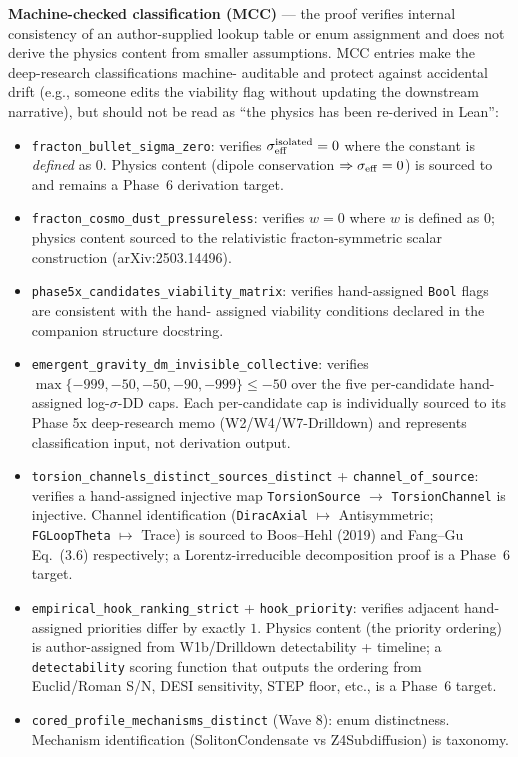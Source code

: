 \documentclass[aps,prd,twocolumn,showpacs,superscriptaddress,nofootinbib]{revtex4-2}
\begin{document}
\textbf{Machine-checked classification (MCC)} --- the proof verifies
internal consistency of an author-supplied lookup table or enum
assignment and does not derive the physics content from smaller
assumptions. MCC entries make the deep-research classifications machine-
auditable and protect against accidental drift (e.g., someone edits the
viability flag without updating the downstream narrative), but should
not be read as ``the physics has been re-derived in Lean'':
\begin{itemize}
\item \texttt{fracton\_bullet\_sigma\_zero}: verifies
  $\sigma_{\rm eff}^{\rm isolated} = 0$ where the constant is \emph{defined}
  as $0$. Physics content (dipole conservation $\Rightarrow
  \sigma_{\rm eff} = 0$) is sourced to~\cite{Pretko2017} and remains a
  Phase~6 derivation target.
\item \texttt{fracton\_cosmo\_dust\_pressureless}: verifies $w = 0$
  where $w$ is defined as $0$; physics content sourced to the
  relativistic fracton-symmetric scalar construction (arXiv:2503.14496).
\item \texttt{phase5x\_candidates\_viability\_matrix}: verifies
  hand-assigned \texttt{Bool} flags are consistent with the hand-
  assigned viability conditions declared in the companion structure
  docstring.
\item \texttt{emergent\_gravity\_dm\_invisible\_collective}: verifies
  $\max\{-999, -50, -50, -90, -999\} \leq -50$ over the five
  per-candidate hand-assigned log-$\sigma$-DD caps. Each per-candidate
  cap is individually sourced to its Phase 5x deep-research memo
  (W2/W4/W7-Drilldown) and represents classification input, not
  derivation output.
\item \texttt{torsion\_channels\_distinct\_sources\_distinct} +
  \texttt{channel\_of\_source}: verifies a hand-assigned injective
  map \texttt{TorsionSource} $\to$ \texttt{TorsionChannel} is
  injective. Channel identification (\texttt{DiracAxial} $\mapsto$
  Antisymmetric; \texttt{FGLoopTheta} $\mapsto$ Trace) is sourced to
  Boos--Hehl (2019) and Fang--Gu~\cite{FangGu2021} Eq.~(3.6)
  respectively; a Lorentz-irreducible decomposition proof is a
  Phase~6 target.
\item \texttt{empirical\_hook\_ranking\_strict} + \texttt{hook\_priority}:
  verifies adjacent hand-assigned priorities differ by exactly $1$.
  Physics content (the priority ordering) is author-assigned from
  W1b/Drilldown detectability + timeline; a \texttt{detectability}
  scoring function that outputs the ordering from Euclid/Roman S/N,
  DESI sensitivity, STEP floor, etc., is a Phase~6 target.
\item \texttt{cored\_profile\_mechanisms\_distinct} (Wave 8): enum
  distinctness. Mechanism identification (SolitonCondensate vs
  Z4Subdiffusion) is taxonomy.
\end{itemize}
\end{document}

